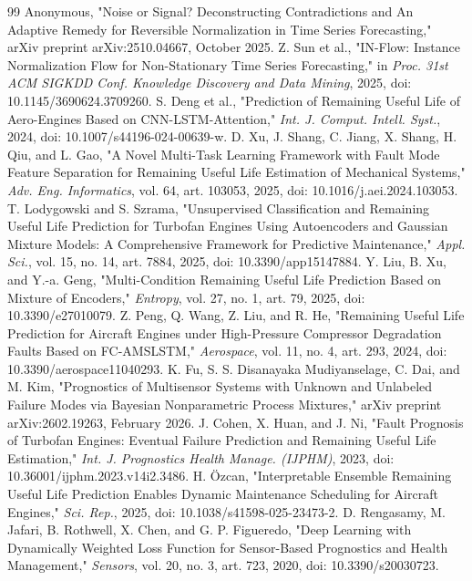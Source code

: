 \documentclass[preprint,10pt]{elsarticle}
\begin{document}
\begin{thebibliography}{99}
  Anonymous, "Noise or Signal? Deconstructing Contradictions and An Adaptive Remedy for Reversible Normalization in Time Series Forecasting," arXiv preprint arXiv:2510.04667, October 2025.
  Z. Sun et al., "IN-Flow: Instance Normalization Flow for Non-Stationary Time Series Forecasting," in \textit{Proc. 31st ACM SIGKDD Conf. Knowledge Discovery and Data Mining}, 2025, doi: 10.1145/3690624.3709260.
  S. Deng et al., "Prediction of Remaining Useful Life of Aero-Engines Based on CNN-LSTM-Attention," \textit{Int. J. Comput. Intell. Syst.}, 2024, doi: 10.1007/s44196-024-00639-w.
  D. Xu, J. Shang, C. Jiang, X. Shang, H. Qiu, and L. Gao, "A Novel Multi-Task Learning Framework with Fault Mode Feature Separation for Remaining Useful Life Estimation of Mechanical Systems," \textit{Adv. Eng. Informatics}, vol. 64, art. 103053, 2025, doi: 10.1016/j.aei.2024.103053.
  T. Lodygowski and S. Szrama, "Unsupervised Classification and Remaining Useful Life Prediction for Turbofan Engines Using Autoencoders and Gaussian Mixture Models: A Comprehensive Framework for Predictive Maintenance," \textit{Appl. Sci.}, vol. 15, no. 14, art. 7884, 2025, doi: 10.3390/app15147884.
  Y. Liu, B. Xu, and Y.-a. Geng, "Multi-Condition Remaining Useful Life Prediction Based on Mixture of Encoders," \textit{Entropy}, vol. 27, no. 1, art. 79, 2025, doi: 10.3390/e27010079.
  Z. Peng, Q. Wang, Z. Liu, and R. He, "Remaining Useful Life Prediction for Aircraft Engines under High-Pressure Compressor Degradation Faults Based on FC-AMSLSTM," \textit{Aerospace}, vol. 11, no. 4, art. 293, 2024, doi: 10.3390/aerospace11040293.
  K. Fu, S. S. Disanayaka Mudiyanselage, C. Dai, and M. Kim, "Prognostics of Multisensor Systems with Unknown and Unlabeled Failure Modes via Bayesian Nonparametric Process Mixtures," arXiv preprint arXiv:2602.19263, February 2026.
  J. Cohen, X. Huan, and J. Ni, "Fault Prognosis of Turbofan Engines: Eventual Failure Prediction and Remaining Useful Life Estimation," \textit{Int. J. Prognostics Health Manage. (IJPHM)}, 2023, doi: 10.36001/ijphm.2023.v14i2.3486.
  H. \"{O}zcan, "Interpretable Ensemble Remaining Useful Life Prediction Enables Dynamic Maintenance Scheduling for Aircraft Engines," \textit{Sci. Rep.}, 2025, doi: 10.1038/s41598-025-23473-2.
  D. Rengasamy, M. Jafari, B. Rothwell, X. Chen, and G. P. Figueredo, "Deep Learning with Dynamically Weighted Loss Function for Sensor-Based Prognostics and Health Management," \textit{Sensors}, vol. 20, no. 3, art. 723, 2020, doi: 10.3390/s20030723.

\end{thebibliography}
\end{document}

